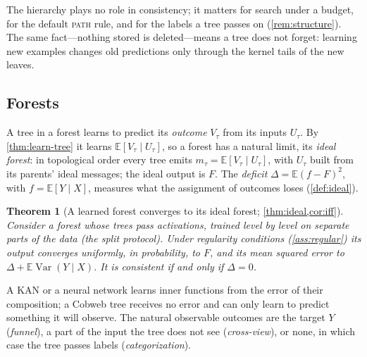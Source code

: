 \documentclass[11pt]{article}
\newtheorem{theorem}{Theorem}
\theoremstyle{definition}
\theoremstyle{remark}
\newcommand{\E}{\mathbb{E}}
\newcommand{\Var}{\operatorname{Var}}
\begin{document}
The hierarchy plays no role in consistency; it matters for search under a budget, for the
default \textsc{path} rule, and for the labels a tree passes on (\cref{rem:structure}).  The
same fact---nothing stored is deleted---means a tree does not forget: learning new examples
changes old predictions only through the kernel tails of the new leaves.

\subsection{Forests}

A tree in a forest learns to predict its \emph{outcome} $V_\tau$ from its inputs $U_\tau$.
By \cref{thm:learn-tree} it learns $\E[V_\tau\mid U_\tau]$, so a forest has a natural limit,
its \emph{ideal forest}: in topological order every tree emits $m_\tau=\E[V_\tau\mid U_\tau]$,
with $U_\tau$ built from its parents' ideal messages; the ideal output is $F$.  The
\emph{deficit} $\Delta=\E(f-F)^2$, with $f=\E[Y\mid X]$, measures what the assignment of
outcomes loses (\cref{def:ideal}).

\begin{theorem}[A learned forest converges to its ideal forest; \cref{thm:ideal,cor:iff}]\label{thm:learn-forest}
Consider a forest whose trees pass activations, trained level by level on separate parts
of the data (the split protocol).  Under regularity conditions (\cref{ass:regular}) its
output converges uniformly, in probability, to $F$, and its mean squared error to
$\Delta+\E\Var(Y\mid X)$.  It is consistent if and only if $\Delta=0$.
\end{theorem}

A KAN or a neural network learns inner functions from the error of their composition; a
Cobweb tree receives no error and can only learn to predict something it will observe.  The
natural observable outcomes are the target $Y$ (\emph{funnel}), a part of the input the tree
does not see (\emph{cross-view}), or none, in which case the tree passes labels
(\emph{categorization}).
\end{document}
